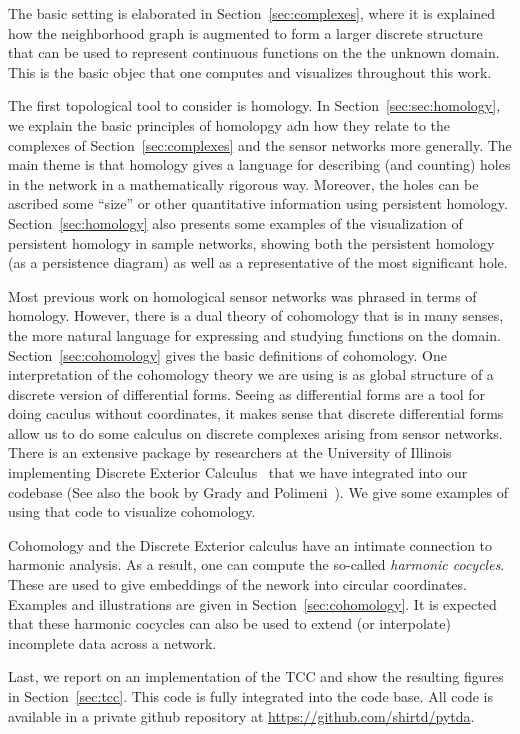   The basic setting is elaborated in Section~\ref{sec:complexes}, where it is explained how the neighborhood graph is augmented to form a larger discrete structure that can be used to represent continuous functions on the the unknown domain.
  This is the basic objec that one computes and visualizes throughout this work.

  The first topological tool to consider is homology.
  In Section~\ref{sec:sec:homology}, we explain the basic principles of homolopgy adn how they relate to the complexes of Section~\ref{sec:complexes} and the sensor networks more generally.
  The main theme is that homology gives a language for describing (and counting) holes in the network in a mathematically rigorous way.
  Moreover, the holes can be ascribed some ``size'' or other quantitative information using persistent homology.
  Section~\ref{sec:homology} also presents some examples of the visualization of persistent homology in sample networks, showing both the persistent homology (as a persistence diagram) as well as a representative of the most significant hole.

  Most previous work on homological sensor networks was phrased in terms of homology.
  However, there is a dual theory of cohomology that is in many senses, the more natural language for expressing and studying functions on the domain.
  Section~\ref{sec:cohomology} gives the basic definitions of cohomology.
  One interpretation of the cohomology theory we are using is as global structure of a discrete version of differential forms.
  Seeing as differential forms are a tool for doing caculus without coordinates, it makes sense that discrete differential forms allow us to do some calculus on discrete complexes arising from sensor networks.
  There is an extensive package by researchers at the University of Illinois implementing Discrete Exterior Calculus~\cite{bell12pydec} that we have integrated into our codebase (See also the book by Grady and Polimeni~\cite{grady10discrete}).
  We give some examples of using that code to visualize cohomology.

  Cohomology and the Discrete Exterior calculus have an intimate connection to harmonic analysis.
  As a result, one can compute the so-called \emph{harmonic cocycles}.
  These are used to give embeddings of the nework into circular coordinates.
  Examples and illustrations are given in Section~\ref{sec:cohomology}.
  It is expected that these harmonic cocycles can also be used to extend (or interpolate) incomplete data across a network.

  Last, we report on an implementation of the TCC and show the resulting figures in Section~\ref{sec:tcc}.
  This code is fully integrated into the code base.
  All code is available in a private github repository at \url{https://github.com/shirtd/pytda}.


